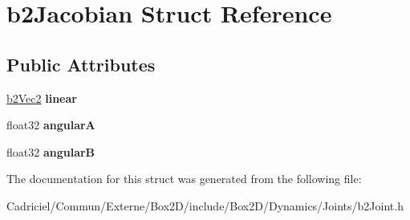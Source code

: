 \hypertarget{structb2_jacobian}{}\section{b2\+Jacobian Struct Reference}
\label{structb2_jacobian}
\subsection*{Public Attributes}
\begin{DoxyCompactItemize}
\item 
\hyperlink{structb2_vec2}{b2\+Vec2} {\bfseries linear}\hypertarget{structb2_jacobian_aa63199b443d411972b9cb6aac6c7cb34}{}\label{structb2_jacobian_aa63199b443d411972b9cb6aac6c7cb34}

\item 
float32 {\bfseries angularA}\hypertarget{structb2_jacobian_a0669f849afcdc154b36f86cb0529d2bc}{}\label{structb2_jacobian_a0669f849afcdc154b36f86cb0529d2bc}

\item 
float32 {\bfseries angularB}\hypertarget{structb2_jacobian_a3bbdbd8e46f4fa9be2e50434edaaeb14}{}\label{structb2_jacobian_a3bbdbd8e46f4fa9be2e50434edaaeb14}

\end{DoxyCompactItemize}


The documentation for this struct was generated from the following file\+:\begin{DoxyCompactItemize}
\item 
Cadriciel/\+Commun/\+Externe/\+Box2\+D/include/\+Box2\+D/\+Dynamics/\+Joints/b2\+Joint.\+h\end{DoxyCompactItemize}
